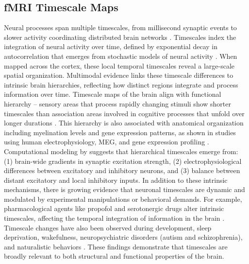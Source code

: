 \documentclass[9pt]{article}
\begin{document}
\subsection{fMRI Timescale Maps}
Neural processes span multiple timescales, from millisecond synaptic events to slower activity coordinating distributed brain networks \citep{buzsaki_large-scale_2004}. Timescales index the integration of neural activity over time, defined by exponential decay in autocorrelation that emerges from stochastic models of neural activity \citep[Supplementary Mathematical Note]{murray_hierarchy_2014}. When mapped across the cortex, these local temporal timescales reveal a large-scale spatial organization. Multimodal evidence links these timescale differences to intrinsic brain hierarchies, reflecting how distinct regions integrate and process information over time. Timescale maps of the brain align with functional hierarchy -- sensory areas that process rapidly changing stimuli show shorter timescales than association areas involved in cognitive processes that unfold over longer durations \citep{raut_hierarchical_2020, gao_neuronal_2020, hasson_hierarchy_2008, murray_hierarchy_2014, stephens_place_2013}. This hierarchy is also associated with anatomical organization including myelination levels and gene expression patterns, as shown in studies using human electrophysiology, MEG, and gene expression profiling \citep{gao_neuronal_2020, shafiei_neurophysiological_2023}.\\

Computational modeling by \citet{li_hierarchical_2022} suggests that hierarchical timescales emerge from: (1) brain-wide gradients in synaptic excitation strength, (2) electrophysiological differences between excitatory and inhibitory neurons, and (3) balance between distant excitatory and local inhibitory inputs. In addition to these intrinsic mechanisms, there is growing evidence that neuronal timescales are dynamic and modulated by experimental manipulations or behavioral demands. For example, pharmacological agents like propofol and serotonergic drugs alter intrinsic timescales, affecting the temporal integration of information in the brain \citep{huang_timescales_2018, shinn_functional_2023}. Timescale changes have also been observed during development, sleep deprivation, wakefulness, neuropsychiatric disorders (autism and schizophrenia), and naturalistic behaviors \citep{martin-burgos_development_2024, meisel_decline_2017, watanabe_atypical_2019, wengler_distinct_2020, manea_neural_2024}. These findings demonstrate that timescales are broadly relevant to both structural and functional properties of the brain.\\
\end{document}
